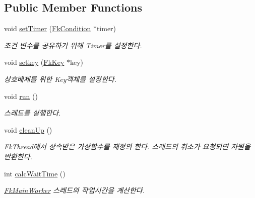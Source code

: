 \subsection*{Public Member Functions}
\begin{DoxyCompactItemize}
\item 
\hypertarget{class_fk_time_scheduler_ac9bd3f14ac29a0d1d6dc136cd9809cd4}{}void \hyperlink{class_fk_time_scheduler_ac9bd3f14ac29a0d1d6dc136cd9809cd4}{set\+Timer} (\hyperlink{class_fk_condition}{Fk\+Condition} $\ast$timer)\label{class_fk_time_scheduler_ac9bd3f14ac29a0d1d6dc136cd9809cd4}

\begin{DoxyCompactList}\small\item\em 조건 변수를 공유하기 위해 Timer를 설정한다. \end{DoxyCompactList}\item 
\hypertarget{class_fk_time_scheduler_a6e84bbb7d0db60d6e75460c22a8a8bb2}{}void \hyperlink{class_fk_time_scheduler_a6e84bbb7d0db60d6e75460c22a8a8bb2}{setkey} (\hyperlink{class_fk_key}{Fk\+Key} $\ast$key)\label{class_fk_time_scheduler_a6e84bbb7d0db60d6e75460c22a8a8bb2}

\begin{DoxyCompactList}\small\item\em 상호배제를 위한 Key객체를 설정한다. \end{DoxyCompactList}\item 
\hypertarget{class_fk_time_scheduler_af1df28699bec08d2cdb5c12aa7d84981}{}void \hyperlink{class_fk_time_scheduler_af1df28699bec08d2cdb5c12aa7d84981}{run} ()\label{class_fk_time_scheduler_af1df28699bec08d2cdb5c12aa7d84981}

\begin{DoxyCompactList}\small\item\em 스레드를 실행한다. \end{DoxyCompactList}\item 
\hypertarget{class_fk_time_scheduler_ad59af1a98dc15ed2ff45a8adc23169f3}{}void \hyperlink{class_fk_time_scheduler_ad59af1a98dc15ed2ff45a8adc23169f3}{clean\+Up} ()\label{class_fk_time_scheduler_ad59af1a98dc15ed2ff45a8adc23169f3}

\begin{DoxyCompactList}\small\item\em Fk\+Thread에서 상속받은 가상함수를 재정의 한다. 스레드의 취소가 요청되면 자원을 반환한다. \end{DoxyCompactList}\item 
\hypertarget{class_fk_time_scheduler_a2c48c8d313103ca21541534defbac0e0}{}int \hyperlink{class_fk_time_scheduler_a2c48c8d313103ca21541534defbac0e0}{calc\+Wait\+Time} ()\label{class_fk_time_scheduler_a2c48c8d313103ca21541534defbac0e0}

\begin{DoxyCompactList}\small\item\em \hyperlink{class_fk_main_worker}{Fk\+Main\+Worker} 스레드의 작업시간을 계산한다. \end{DoxyCompactList}\end{DoxyCompactItemize}
